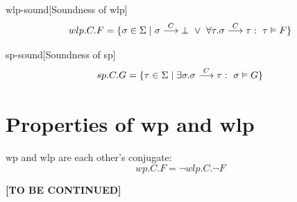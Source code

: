 \begin{theorem}{wlp-sound}[Soundness of wlp]{\normalfont\cite{dijkstra90}}
\ \vspace{-1.5mm}
\[
wlp.C.F = \{ \sigma\in\S \mid
\sigma\goto{C}\bot \ \vee\ 
\forall \tau. \sigma\goto{C}\tau:\  \tau\vDash F
 \}
\]
\end{theorem}

\begin{theorem}{sp-sound}[Soundness of sp]{\normalfont\cite{vries11,zhang22}}
\ \vspace{-1.5mm}
\[
sp.C.G = \{ \tau\in{\Sigma} \mid \exists \sigma. \sigma\stackrel{C}{\longrightarrow}\tau: \  \sigma\vDash G\}
\]
\label{thm:sp}
\end{theorem}


\section{Properties of wp and wlp}
wp and wlp are each other's conjugate: 
\[wp.C.F = \neg wlp.C.\neg F\]



\textbf{[TO BE CONTINUED]}


